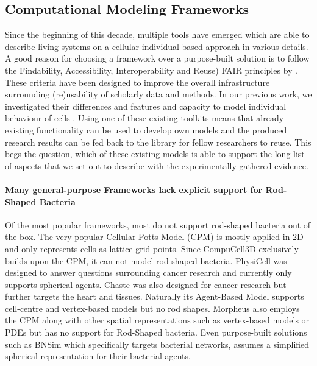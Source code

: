 \documentclass{article}
\begin{document}
\subsection{Computational Modeling Frameworks}

Since the beginning of this decade, multiple tools have emerged which are able to describe living
systems on a cellular individual-based approach in various details.
A good reason for choosing a framework over a purpose-built solution is to follow the Findability,
Accessibility, Interoperability and Reuse) FAIR principles by \cite{Wilkinson2016}.
These criteria have been designed to improve the overall infrastructure surrounding (re)usability of
scholarly data and methods.
In our previous work, we investigated their differences and features and capacity to model
individual behaviour of cells \cite{Pleyer2023}.
Using one of these existing toolkits means that already existing functionality can be used to
develop own models and the produced research results can be fed back to the library for fellow
researchers to reuse.
This begs the question, which of these existing models is able to support the long list of aspects
that we set out to describe with the experimentally gathered evidence.

\paragraph{Many general-purpose Frameworks lack explicit support for Rod-Shaped Bacteria}

Of the most popular frameworks, most do not support rod-shaped bacteria out of the box.
The very popular Cellular Potts Model (CPM) \cite{Graner1992} is mostly applied in 2D and only
represents cells as lattice grid points.
Since CompuCell3D \cite{Swat2012} exclusively builds upon the CPM, it can not model rod-shaped
bacteria.
PhysiCell \cite{Ghaffarizadeh2018} was designed to answer questions surrounding cancer research and
currently only supports spherical agents.
Chaste \cite{Cooper2020} was also designed for cancer research but further targets the heart and
tissues.
Naturally its Agent-Based Model supports cell-centre and vertex-based models but no rod shapes.
Morpheus \cite{Starru2014} also employs the CPM along with other spatial representations such as
vertex-based models or PDEs but has no support for Rod-Shaped bacteria.
Even purpose-built solutions such as BNSim \cite{Wei2013} which specifically targets bacterial
networks, assumes a simplified spherical representation for their bacterial agents.
\end{document}
